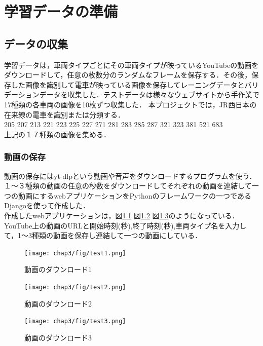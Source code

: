 

\chapter{学習データの準備}\label{genri}

\section{データの収集}
学習データは，車両タイプごとにその車両タイプが映っているYouTubeの動画をダウンロードして，任意の枚数分のランダムなフレームを保存する．その後，保存した画像を識別して電車が映っている画像を保存してレーニングデータとバリデーションデータを収集した．テストデータは様々なウェブサイトから手作業で17種類の各車両の画像を10枚ずつ収集した．
本プロジェクトでは，JR西日本の在来線の電車を識別または分類する．\\
205  207  213  221  223  225  227  271  281  283  285  287  321  323  381  521  683 \\
上記の１７種類の画像を集める．
\subsection{動画の保存}
動画の保存にはyt-dlpという動画や音声をダウンロードするプログラムを使う．
１〜３種類の動画の任意の秒数をダウンロードしてそれぞれの動画を連結して一つの動画にするwebアプリケーションをPythonのフレームワークの一つであるDjangoを使って作成した．\\
	作成したwebアプリケーションは，図\ref{test1} 図\ref{test2}  図\ref{test3}のようになっている．
	YouTube上の動画のURLと開始時刻(秒),終了時刻(秒),車両タイプ名を入力して，1〜3種類の動画を保存し連結して一つの動画にしている．
	
\begin{figure}[H]
	\centering
	\texttt{[image: chap3/fig/test1.png]}
	\caption{動画のダウンロード1}
	\label{test1}
\end{figure}
\begin{figure}[H]
	\texttt{[image: chap3/fig/test2.png]}
	\caption{動画のダウンロード2}
	\label{test2}
\end{figure}
\begin{figure}[H]
	\texttt{[image: chap3/fig/test3.png]}
	\caption{動画のダウンロード3}
	\label{test3}
\end{figure}

